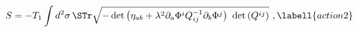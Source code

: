 \begin{equation}
S=-T_1\int d^2\sigma\, \STr\sqrt{-\det\left(\eta_{ab}+
\lambda^2\partial_a\Phi^i Q^{-1}_{ij}\partial_b\Phi^j\right)
\ \det\left(Q^{ij}\right)}\ ,\labell{action2}
\end{equation}

